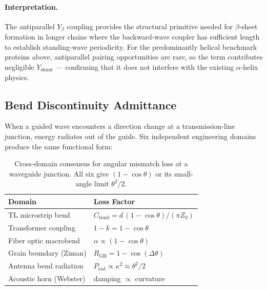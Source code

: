 \paragraph{Interpretation.}
The antiparallel $Y_\beta$ coupling provides the structural primitive
needed for $\beta$-sheet formation in longer chains where the
backward-wave coupler has sufficient length to establish standing-wave
periodicity.  For the predominantly helical benchmark proteins above,
antiparallel pairing opportunities are rare, so the term contributes
negligible $Y_\text{shunt}$ --- confirming that it does not interfere
with the existing $\alpha$-helix physics.

\subsection{Bend Discontinuity Admittance}
\label{sec:bend_admittance}

When a guided wave encounters a direction change at a transmission-line
junction, energy radiates out of the guide.  Six independent
engineering domains produce the same functional form:

\begin{table}[H]
\centering
\caption{Cross-domain consensus for angular mismatch loss at a
waveguide junction.  All six give $(1-\cos\theta)$ or its
small-angle limit $\theta^2/2$.}
\label{tab:bend_consensus}
\small
\begin{tabular}{@{}l l@{}}
\toprule
\textbf{Domain} & \textbf{Loss Factor} \\
\midrule
TL microstrip bend       & $C_\text{bend} = d\,(1-\cos\theta)/(\pi Z_0)$ \\
Transformer coupling     & $1 - k = 1 - \cos\theta$ \\
Fiber optic macrobend    & $\alpha \propto (1 - \cos\theta)$ \\
Grain boundary (Ziman)   & $R_\text{GB} = 1 - \cos(\Delta\theta)$ \\
Antenna bend radiation   & $P_\text{rad} \propto \kappa^2 \approx \theta^2/2$ \\
Acoustic horn (Webster)  & damping $\propto$ curvature \\
\bottomrule
\end{tabular}
\end{table}

